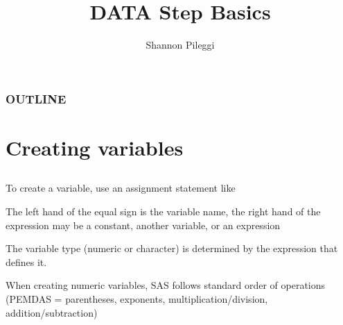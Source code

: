 




\title[Lecture 4]{DATA Step Basics}
\author[Pileggi]{Shannon Pileggi}


\date{}




\begin{frame}
\titlepage
\end{frame}

\begin{frame}
\frametitle{OUTLINE\qquad\qquad\qquad} \tableofcontents[hideallsubsections]
\end{frame}


\section[Creating variables]{Creating variables}
\subsection{}
\begin{frame}[fragile]
\emp
\end{frame}

\begin{frame}
\bi
\item To create a variable, use an assignment statement like
\item[] 
\item The left hand of the equal sign is the variable name, the right hand of the expression may be a constant, another variable, or an expression
\item The variable type (numeric or character) is determined by the expression that defines it.
\item When creating numeric variables, SAS follows standard order of operations (PEMDAS = parentheses, exponents, multiplication/division, addition/subtraction)
\ei
\end{frame}

